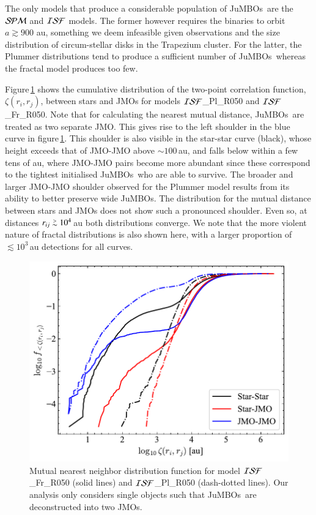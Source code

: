 \documentclass[submission,phys]{lib/SciPost}
\def\apgt{\ {\raise-.5ex\hbox{$\buildrel>\over\sim$}}\ }
\newcommand{\jumbos}{\mbox{JuMBOs}}
\begin{document}
The only models that produce a considerable population of \jumbos\,
are the ${\cal SPM}$ and ${\cal ISF}$ models. The former however
requires the binaries to orbit $a \gtrsim 900$ au, something we deem infeasible 
given observations and the size distribution of circum-stellar disks in the 
Trapezium cluster. For the latter, the Plummer distributions tend to produce 
a sufficient number of \jumbos\, whereas the fractal model produces too few.

Figure\,\ref{Fig:twopoint_correlation_ISF_Fr050} shows the cumulative
distribution of the two-point correlation function, $\zeta(r_i,r_j)$,
between stars and JMOs for models ${\cal ISF}$\_Pl\_R050 and ${\cal
  ISF}$\_Fr\_R050.  Note that for calculating the nearest mutual
distance, \jumbos\, are treated as two separate JMO.  This gives rise
to the left shoulder in the blue curve in
figure\,\ref{Fig:twopoint_correlation_ISF_Fr050}. This shoulder is
also visible in the star-star curve (black), whose height exceeds that
of JMO-JMO above $\sim 100$\,au, and falls below within a few tens of
au, where JMO-JMO pairs become more abundant since these correspond to
the tightest initialised \jumbos\, who are able to survive.  The
broader and larger JMO-JMO shoulder observed for the Plummer model
results from its ability to better preserve wide JuMBOs. The
distribution for the mutual distance between stars and JMOs does not
show such a pronounced shoulder.  Even so, at distances $r_{ij} \apgt
10^4$\,au both distributions converge.  We note that the more violent
nature of fractal distributions is also shown here, with a larger
proportion of $\lesssim10^{3}$\,au detections for all curves.

\begin{figure}
    \centering
        \includegraphics[width=0.75\columnwidth]{figures/two_point_corr_rvir0.5_jmo.pdf}
        \caption{Mutual nearest neighbor distribution function for
          model ${\cal ISF}$\_Fr\_R050 (solid lines) and ${\cal
            ISF}$\_Pl\_R050 (dash-dotted lines). Our analysis only
          considers single objects such that \jumbos\, are
          deconstructed into two JMOs.}
        \label{Fig:twopoint_correlation_ISF_Fr050}
\end{figure}
\end{document}
